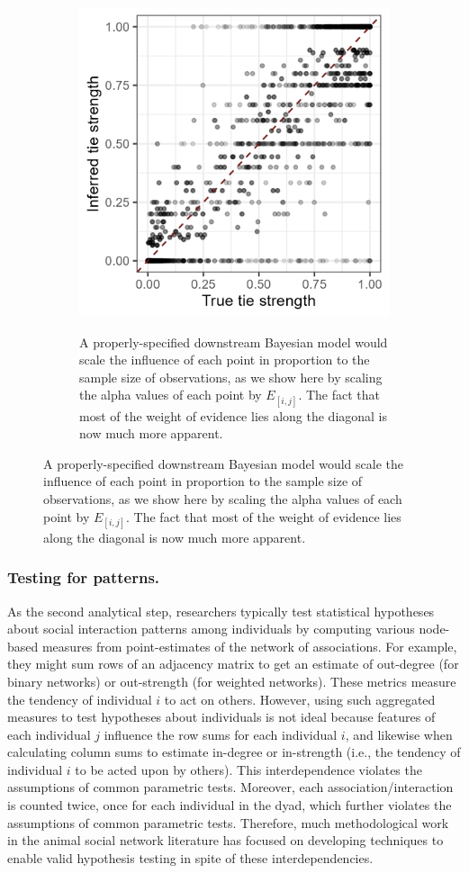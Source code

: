 \documentclass[Afour,sageh,times]{sagej}
\begin{document}
\begin{figure}[t]
    \begin{subfigure}[b]{0.42\textwidth}
        \caption{A properly-specified downstream Bayesian model would scale the influence of each point in proportion to the sample size of observations, as we show here by scaling the alpha values of each point by $E_{[i,j]}$. The fact that most of the weight of evidence lies along the diagonal is now much more apparent.}
        \includegraphics[clip,width=\textwidth]{Figures/ScatterFrameB.png}
        \label{srmx3b_drs}
    \end{subfigure}
\end{figure}

\subsubsection{Testing for patterns.}
As the second analytical step, researchers typically test statistical hypotheses about social interaction patterns among individuals by computing various node-based measures from point-estimates of the network of associations. For example, they might sum rows of an adjacency matrix to get an estimate of out-degree (for binary networks) or out-strength (for weighted networks). These metrics measure the tendency of individual $i$ to act on others. However, using such aggregated measures to test hypotheses about individuals is not ideal because features of each individual $j$ influence the row sums for each individual $i$, and likewise when calculating column sums to estimate in-degree or in-strength (i.e., the tendency of individual $i$ to be acted upon by others). This interdependence violates the assumptions of common parametric tests. Moreover, each association/interaction is counted twice, once for each individual in the dyad, which further violates the assumptions of common parametric tests. Therefore, much methodological work in the animal social network literature has focused on developing techniques to enable valid hypothesis testing in spite of these interdependencies. 
\end{document}
